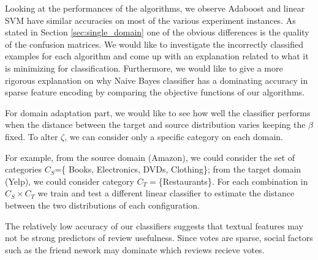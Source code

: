 \documentclass[letterpaper]{article}
\begin{document}
Looking at the performances of the algorithms, we observe Adaboost and
linear SVM have similar accuracies on most of the various experiment
instances. As stated in Section \ref{sec:single_domain} one of the
obvious differences is the quality of the confusion matrices. We would
like to investigate the incorrectly classified examples for each
algorithm and come up with an explanation related to what it is
minimizing for classification.  Furthermore, we would like to give a
more rigorous explanation on why Naive Bayes classifier has a
dominating accuracy in sparse feature encoding by comparing the
objective functions of our algorithms.

For domain adaptation part, we would like to see how well the
classifier performs when the distance between the target and source
distribution varies keeping the $\beta$ fixed. To alter $\zeta$, we
can consider only a specific category on each domain.

For example, from the source domain (Amazon), we could consider the
set of categories $C_S$=\{ Books, Electronics, DVDs, Clothing\};
from the target domain (Yelp), we could consider category
$C_T=$\{Restaurants\}. For each combination in $C_S\times C_T$ we
train and test a different linear classifier to estimate the distance
between the two distributions of each configuration.

The relatively low accuracy of our classifiers suggests that textual features
may not be strong predictors of review usefulness.  Since votes are sparse,
social factors such as the friend nework may dominate which reviews recieve
votes.  

\small


\end{document}
